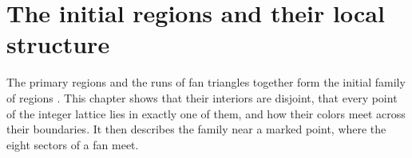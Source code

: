 \chapter{The initial regions and their local structure}%
\label{ch:peps_area_law_initial_regions}

The primary regions and the runs of fan triangles together form the initial
family of regions \cite[Section~11]{OpenAI2026AreaLaw}. This chapter shows
that their interiors are disjoint, that every point of the integer lattice
lies in exactly one of them, and how their colors meet across their
boundaries. It then describes the family near a marked point, where the eight
sectors of a fan meet.


















